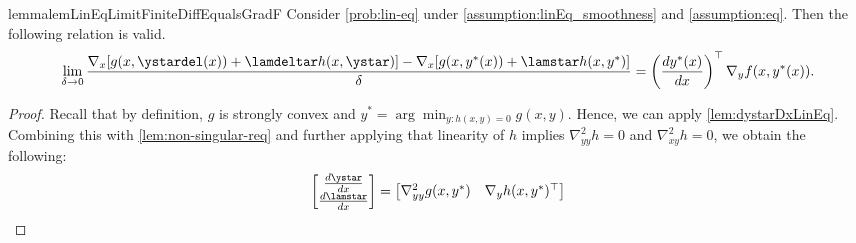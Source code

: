 \begin{restatable}{lemma}{lemLinEqLimitFiniteDiffEqualsGradF}\label{lem:lineq-in-limit-finitediff-equals-gradf}
Consider  \cref{prob:lin-eq} under \cref{assumption:linEq_smoothness} and \cref{assumption:eq}.
Then the
following relation is valid.
\[
\lim_{\delta\rightarrow0}\frac{\nabla_{x}[g(x,\ystardel(x))+\lamdeltar h(x,\ystar)]-\nabla_{x}[g(x,y^{*}(x))+\lamstar h(x,y^{*})]}{\delta}=\left(\frac{d y^{*}(x)}{d x}\right)^\top\nabla_{y}f(x,y^{*}(x)).
\]
\end{restatable}
\begin{proof}
Recall that by definition, $g$ is strongly convex and $y^* = \arg\min_{y: h(x,y)=0} g(x,y)$. Hence, we can apply \cref{lem:dystarDxLinEq}. Combining this with \cref{lem:non-singular-req} and further applying that linearity of $h$ implies $\nabla^2_{yy}h = 0$ and $\nabla^2_{xy}h=0$, we obtain the following: 
\[ \begin{bmatrix}\frac{d\ystar}{dx}\\
\frac{d\lamstar}{dx}
\end{bmatrix}=\begin{bmatrix}\nabla^2_{yy} g(x,y^{*}) & \nabla_y h(x,y^{*})^{\top}\\

\end{bmatrix}\]
\end{proof}
